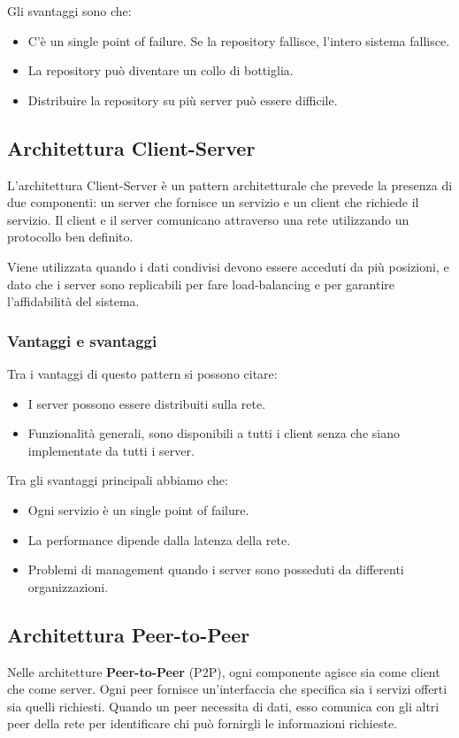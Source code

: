 Gli svantaggi sono che:
\begin{itemize}
    \item C'è un single point of failure. Se la repository fallisce,
    l'intero sistema fallisce.
    \item La repository può diventare un collo di bottiglia.
    \item Distribuire la repository su più server può essere difficile.
\end{itemize}
\subsection{Architettura Client-Server}
L'architettura Client-Server è un pattern architetturale che prevede la presenza
di due componenti: un server che fornisce un servizio e un client che richiede
il servizio. Il client e il server comunicano attraverso una rete utilizzando
un protocollo ben definito.

Viene utilizzata quando i dati condivisi devono essere acceduti da più posizioni, 
e dato che i server sono replicabili per fare load-balancing e per garantire
l'affidabilità del sistema.

\subsubsection{Vantaggi e svantaggi}
Tra i vantaggi di questo pattern si possono citare:
\begin{itemize}
    \item I server possono essere distribuiti sulla rete.
    \item Funzionalità generali, sono disponibili a tutti i client senza che siano 
    implementate da tutti i server.
\end{itemize}
Tra gli svantaggi principali abbiamo che:
\begin{itemize}
    \item Ogni servizio è un single point of failure.
    \item La performance dipende dalla latenza della rete.
    \item Problemi di management quando i server sono posseduti da differenti 
    organizzazioni.
\end{itemize}

\subsection{Architettura Peer-to-Peer}
Nelle architetture \textbf{Peer-to-Peer} (P2P), ogni componente agisce sia
come client che come server. Ogni peer fornisce un'interfaccia che specifica
sia i servizi offerti sia quelli richiesti. Quando un peer necessita di dati,
esso comunica con gli altri peer della rete per identificare chi può fornirgli
le informazioni richieste.

